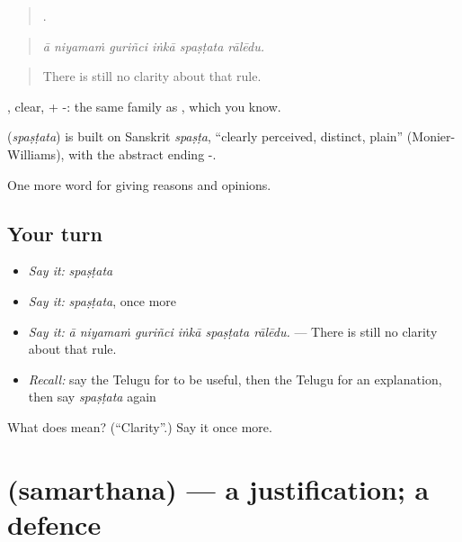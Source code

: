 \begin{quote}
     .
\end{quote}

\begin{quote}
\emph{ā niyamaṁ guriñci iṅkā spaṣṭata rālēdu.}
\end{quote}

\begin{quote}
There is still no clarity about that rule.
\end{quote}

, clear, + -: the same family as , which you know.

\begin{cousinweb}
\textbf{} (\emph{spaṣṭata}) is built on Sanskrit \emph{spaṣṭa}, \textquotedblleft{}clearly perceived, distinct, plain\textquotedblright{} (Monier-Williams), with the abstract ending -.
\end{cousinweb}

\begin{grammarlens}[title={What you've built}]
One more word for giving reasons and opinions.
\end{grammarlens}

\subsection*{Your turn}
\begin{itemize}
\raggedright
  \item \emph{Say it:} \emph{spaṣṭata}
  \item \emph{Say it:} \emph{spaṣṭata}, once more
  \item \emph{Say it:} \emph{ā niyamaṁ guriñci iṅkā spaṣṭata rālēdu.} — There is still no clarity about that rule.
  \item \emph{Recall:} say the Telugu for to be useful, then the Telugu for an explanation, then say \emph{spaṣṭata} again
\end{itemize}

\begin{tcolorbox}[breakable,colback=teal!4,colframe=teal!35!black,title={Before you move on}]
What does  mean? (\textquotedblleft{}Clarity\textquotedblright{}.) Say it once more.
\end{tcolorbox}
\section[\texorpdfstring{\te{సమర్థన} (samarthana)}{సమర్థన (samarthana)}]{ (samarthana) — a justification; a defence}

